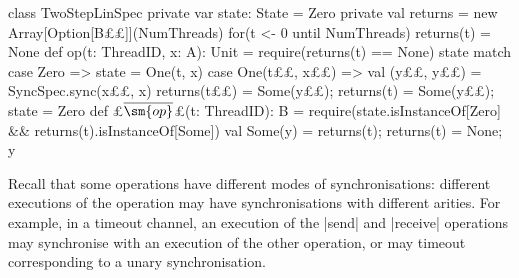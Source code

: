 \begin{trivlist}
\item[]
\begin{minipage}{92mm}
\begin{scala}
class TwoStepLinSpec{
  private var state: State = Zero
  private val returns = new Array[Option[B££]](NumThreads)
  for(t <- 0 until NumThreads) returns(t) = None
  def op(t: ThreadID, x: A): Unit = {
    require(returns(t) == None)
    state match{
      case Zero => state = One(t, x)
      case One(t££, x££) => 
        val (y££, y££) = SyncSpec.sync(x££, x) 
        returns(t££) = Some(y££); returns(t) = Some(y££); state = Zero
    }
  }
  def £$\overline{\sm{op}}$£(t: ThreadID): B = {
    require(state.isInstanceOf[Zero] && returns(t).isInstanceOf[Some])
    val Some(y) = returns(t); returns(t) = None; y
  }
}
\end{scala}
\end{minipage}
\hfill 
%
\begin{minipage}{37.8mm}
%
\vspace{40mm}
\end{minipage}%
\end{trivlist}




Recall that some operations have different modes of synchronisations:
different executions of the operation may have synchronisations with different
arities.  For example, in a timeout channel, an execution of the |send| and
|receive| operations may synchronise with an execution of the other operation,
or may timeout corresponding to a unary synchronisation.
%

